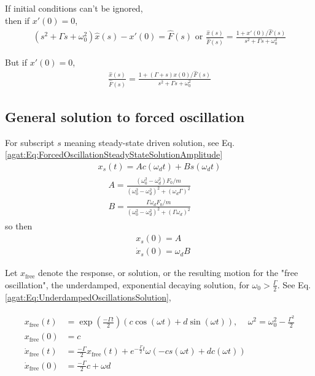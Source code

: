 If initial conditions can't be ignored, \\
then if $x'(0) =0$,
\[
\begin{gathered}
	(s^2 + \Gamma s + \omega_0^2) \widehat{x}(s) - x'(0) = \widehat{F}(s) \text{ or } \frac{ \widehat{x}(s) }{ \widehat{F}(s) } = \frac{ 1 + x'(0) / \widehat{F}(s) }{ s^2 + \Gamma s + \omega_0^2 }
\end{gathered}
\]

But if $x'(0) =0$,
\[
\begin{gathered}
	\frac{ \widehat{x}(s) }{ \widehat{F}(s) } = \frac{ 1 + (\Gamma +s )x(0) / \widehat{F}(s) }{ s^2 + \Gamma s + \omega_0^2 }
\end{gathered}
\]

\subsection{General solution to forced oscillation}

For subscript $s$ meaning steady-state driven solution, see Eq. \ref{agat:Eq:ForcedOscillationSteadyStateSolutionAmplitude}
\[
\begin{gathered}
	x_s(t) = Ac(\omega_d t) + Bs(\omega_d t) \\
	\begin{aligned}
		& A = \frac{ (\omega_0^2 - \omega_d^2) F_0 / m }{ (\omega_0^2 - \omega_d^2)^2 + (\omega_d \Gamma)^2 } \\
		& B = \frac{ \Gamma \omega_d F_0 / m }{ (\omega_0^2 - \omega_d^2)^2 + (\Gamma \omega_d)^2 }
	\end{aligned}
\end{gathered}
\] 
so then
\[
\begin{aligned}
	& x_s(0) = A \\
	& \dot{x}_s(0) = \omega_dB
\end{aligned}
\]

Let $x_{\text{free}}$ denote the response, or solution, or the resulting motion for the "free oscillation", the underdamped, exponential decaying solution, for $\omega_0 > \frac{\Gamma}{2}$. See Eq. \ref{agat:Eq:UnderdampedOscillationsSolution},

\[
\begin{gathered}
	\begin{aligned}
		x_{\text{free}}(t) & = \exp{ \left( \frac{-\Gamma t}{2} \right) } (c\cos{(\omega t)} + d\sin{ (\omega t)} ), \quad \, \omega^2 = \omega_0^2 -\frac{\Gamma^2}{2} \\
		x_{\text{free}}(0) &= c \\
		\dot{x}_{\text{free}}(t) & = \frac{-\Gamma}{2} x_{\text{free}}(t) + e^{-\frac{\Gamma}{2} t} \omega( - cs(\omega t) + dc(\omega t) ) \\
		\dot{x}_{\text{free}}(0) & = \frac{-\Gamma}{2} c + \omega d
	\end{aligned}
\end{gathered}
\]

